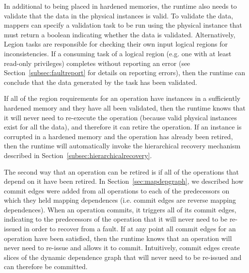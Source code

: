 In additional to being placed in hardened memories, the runtime
also needs to validate that the data in the physical instances
is valid. To validate the data, mappers can specify a
validation task to be run using the physical instance that 
must return a boolean indicating whether the data is validated.
Alternatively, Legion tasks are responsible for checking their
own input logical regions for inconsistencies. If a consuming
task of a logical region (e.g. one with at least read-only
privileges) completes without reporting an error (see 
Section~\ref{subsec:faultreport} for details on reporting
errors), then the runtime can conclude that the data generated
by the task has been validated.

If all of the region requirements for an operation have instances
in a sufficiently hardened memory and they have all been 
validated, then the runtime knows that it will never need to 
re-execute the operation (because valid physical instances exist 
for all the data), and therefore it can retire the operation. 
If an instance is corrupted in a hardened memory and the operation 
has already been retired, then the runtime will automatically invoke 
the hierarchical recovery mechanism described in 
Section~\ref{subsec:hierarchicalrecovery}.

The second way that an operation can be retired is if all of the
operations that depend on it have been retired. In 
Section~\ref{sec:mapdepgraph}, we described how commit edges 
were added from all operations to each of the predecessors on 
which they held mapping dependences (i.e. commit edges are 
reverse mapping dependences). When an operation commits, it
triggers all of its commit edges, indicating to the predecessors
of the operation that it will never need to be re-issued
in order to recover from a fault. If at any point all commit
edges for an operation have been satisfied, then the runtime
knows that an operation will never need to re-issue and allows
it to commit. Intuitively, commit edges create slices of the
dynamic dependence graph that will never need to be re-issued 
and can therefore be committed.

